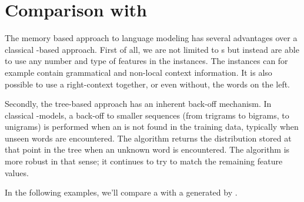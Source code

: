 \documentclass[a4paper,10pt,twoside]{report}
\begin{document}
\section{Comparison with \srilm{}}

The memory based approach to language modeling has several advantages
over a classical \ngram{}-based approach. First of all, we are not
limited to \ngram{}s but instead are able to use any number and type
of features in the instances. The instances can for example contain
grammatical and non-local context information. It is also possible to
use a right-context together, or even without, the words on the
left. 

Secondly, the tree-based approach has an inherent back-off
mechanism. In classical \ngram{}-models, a back-off to smaller
sequences (from trigrams to bigrams, to unigrams) is performed
when an \ngram{} is not found in the training data, typically when
unseen words are encountered. The \igtree{} algorithm returns the
distribution stored at that point in the tree when an unknown word is
encountered. The \triblt{} algorithm is more robust in that sense; it
continues to try to match the remaining feature values. 

In the following examples, we'll compare a \mb{} \lm{} with a \lm{}
generated by \srilm{}. 

\end{document}
